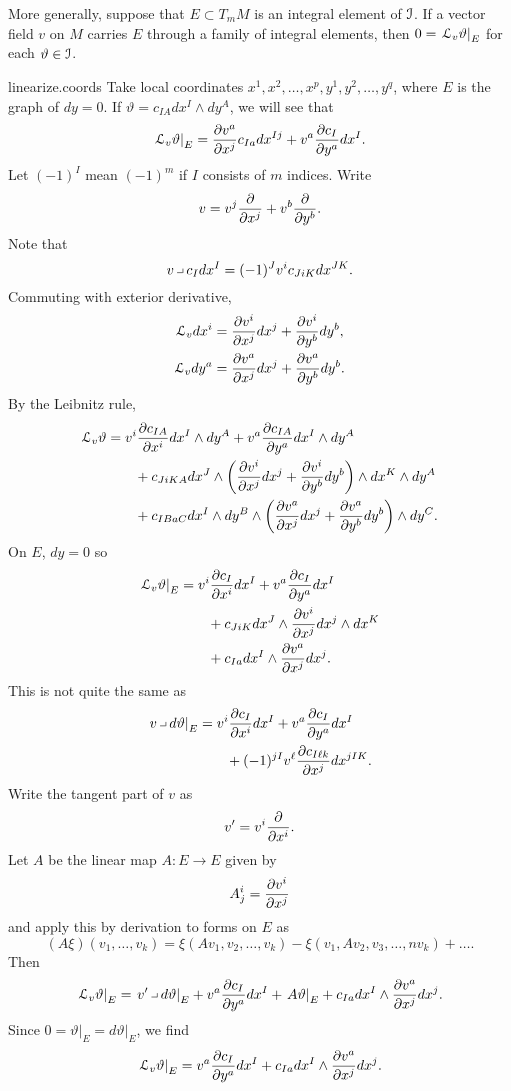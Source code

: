 More generally, suppose that \(E \subset T_m M\) is an integral element of \(\mathcal{I}\).
If a vector field \(v\) on \(M\) carries \(E\) through a family of integral elements, then \(0=\left.\EuScript L_v \vartheta\right|_E\) for each \(\vartheta \in \mathcal{I}\).
\begin{answer}{linearize.coords}
Take local coordinates \(x^1,x^2,\dots,x^p, y^1,y^2,\dots,y^q\), where \(E\) is the graph of \(dy=0\). 
If \(\vartheta = c_{IA} dx^I\wedge dy^A\), we will see that
\[
\left.\LieDer_v \vartheta\right|_E = 
\pderiv{v^a}{x^j} c_{Ia} dx^{Ij} + v^a \pderiv{c_I}{y^a} dx^I .
\]
Let \((-1)^I\) mean \((-1)^m\) if \(I\) consists of \(m\) indices.
Write
\[
v = v^j \pderiv{}{x^j} + v^b \pderiv{}{y^b}.
\]
Note that
\[
v \hook c_I dx^I = (-1)^J v^i c_{JiK} dx^{JK}.
\]
Commuting with exterior derivative,
\begin{align*}
\LieDer_v dx^i &= \pderiv{v^i}{x^j} dx^j + \pderiv{v^i}{y^b} dy^b, \\
\LieDer_v dy^a &= \pderiv{v^a}{x^j} dx^j + \pderiv{v^a}{y^b} dy^b.
\end{align*}
By the Leibnitz rule,
\begin{align*}
\LieDer_v \vartheta
&=
v^i \pderiv{c_{IA}}{x^i} dx^I \wedge dy^A 
+
v^a \pderiv{c_{IA}}{y^a} dx^I \wedge dy^A 
\\
&\qquad
+ c_{JiKA} dx^J \wedge \pr{\pderiv{v^i}{x^j} dx^j + \pderiv{v^i}{y^b} dy^b}  \wedge dx^K \wedge dy^A
\\
&\qquad
+ c_{IBaC} dx^I \wedge dy^B \wedge \pr{\pderiv{v^a}{x^j} dx^j + \pderiv{v^a}{y^b} dy^b}  \wedge dy^C.
\end{align*}
On \(E\), \(dy=0\) so
\begin{align*}
\left.\LieDer_v \vartheta\right|_E
&=
v^i \pderiv{c_I}{x^i} dx^I
+
v^a \pderiv{c_I}{y^a} dx^I
\\
&\qquad
+ c_{JiK} dx^J \wedge \pderiv{v^i}{x^j} dx^j  \wedge dx^K
\\
&\qquad
+ c_{Ia} dx^I \wedge \pderiv{v^a}{x^j} dx^j.
\end{align*}
This is not quite the same as
\begin{align*}
\left.v\hook d\vartheta\right|_E
&=
v^i\pderiv{c_I}{x^i}dx^I
+
v^a\pderiv{c_I}{y^a}dx^I
\\
&\qquad+(-1)^{jI}v^{\ell}\pderiv{c_{I\ell k}}{x^j}dx^{jIK}.
\end{align*}
Write the tangent part of \(v\) as
\[
v' = v^i \pderiv{}{x^i}.
\]
Let \(A\) be the linear map \(A \colon E \to E\) given by
\[
A^i_j = \pderiv{v^i}{x^j}
\]
and apply this by derivation to forms on \(E\) as
\[
(A\xi)(v_1,\dots,v_k)=\xi(Av_1,v_2,\dots,v_k)-\xi(v_1,Av_2,v_3,\dots,nv_k)+\dots.
\]
Then
\[
\left.\LieDer_v \vartheta\right|_E
=
\left.v' \hook d\vartheta\right|_E 
+
v^a \pderiv{c_I}{y^a} dx^I
+ \left.A\vartheta\right|_E
+ c_{Ia} dx^I \wedge \pderiv{v^a}{x^j} dx^j.
\]
Since \(0=\left.\vartheta\right|_E=\left.d\vartheta\right|_E\), we find
\[
\left.\LieDer_v \vartheta\right|_E
=
v^a \pderiv{c_I}{y^a} dx^I
+ c_{Ia} dx^I \wedge \pderiv{v^a}{x^j} dx^j.
\]%
\end{answer}
